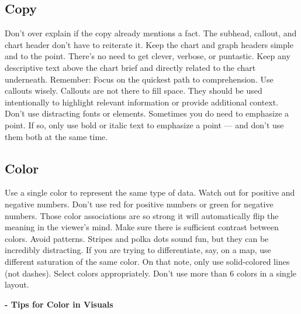\documentclass[]{book}
\begin{document}
\hypertarget{copy}{%
\subsection{Copy}\label{copy}}

Don't over explain if the copy already mentions a fact. The subhead, callout, and chart header don't have to reiterate it. Keep the chart and graph headers simple and to the point. There's no need to get clever, verbose, or puntastic. Keep any descriptive text above the chart brief and directly related to the chart underneath. Remember: Focus on the quickest path to comprehension. Use callouts wisely. Callouts are not there to fill space. They should be used intentionally to highlight relevant information or provide additional context. Don't use distracting fonts or elements. Sometimes you do need to emphasize a point. If so, only use bold or italic text to emphasize a point --- and don't use them both at the same time.

\hypertarget{color}{%
\subsection{Color}\label{color}}

Use a single color to represent the same type of data. Watch out for positive and negative numbers. Don't use red for positive numbers or green for negative numbers. Those color associations are so strong it will automatically flip the meaning in the viewer's mind. Make sure there is sufficient contrast between colors. Avoid patterns. Stripes and polka dots sound fun, but they can be incredibly distracting. If you are trying to differentiate, say, on a map, use different saturation of the same color. On that note, only use solid-colored lines (not dashes). Select colors appropriately. Don't use more than 6 colors in a single layout.

\textbf{- Tips for Color in Visuals}
\end{document}
